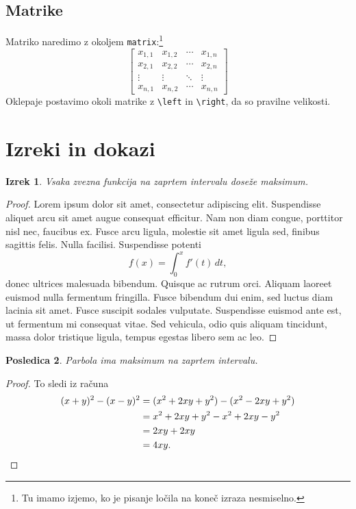 \documentclass{amsart}
\newtheorem{izrek}{Izrek}
\newtheorem{posledica}[izrek]{Posledica}
\begin{document}
\subsection{Matrike}

Matriko naredimo z okoljem \texttt{matrix}:\footnote{Tu imamo izjemo, ko je pisanje ločila
  na koneč izraza nesmiselno.}
%
\begin{equation*}
  \left[
  \begin{matrix}
    x_{1,1} & x_{1,2} & \cdots & x_{1,n} \\
    x_{2,1} & x_{2,2} & \cdots & x_{2,n} \\
    \vdots  & \vdots  & \ddots & \vdots  \\
    x_{n,1} & x_{n,2} & \cdots & x_{n,n}
  \end{matrix}
  \right]
\end{equation*}
%
Oklepaje postavimo okoli matrike z \verb|\left| in \verb|\right|, da so pravilne
velikosti.

\section{Izreki in dokazi}
\label{sec:izreki-dokazi}

\begin{izrek}
  \label{izrek:max-zvezna}
  Vsaka zvezna funkcija na zaprtem intervalu doseže maksimum.
\end{izrek}

\begin{proof}
  Lorem ipsum dolor sit amet, consectetur adipiscing elit. Suspendisse aliquet arcu sit
  amet augue consequat efficitur. Nam non diam congue, porttitor nisl nec, faucibus ex.
  Fusce arcu ligula, molestie sit amet ligula sed, finibus sagittis felis. Nulla facilisi.
  Suspendisse potenti
  \[
    f(x) = \int_0^x f'(t) \, d t,
  \]
  donec ultrices malesuada bibendum. Quisque ac rutrum orci. Aliquam
  laoreet euismod nulla fermentum fringilla. Fusce bibendum dui enim, sed luctus diam
  lacinia sit amet. Fusce suscipit sodales vulputate. Suspendisse euismod ante est, ut
  fermentum mi consequat vitae. Sed vehicula, odio quis aliquam tincidunt, massa dolor
  tristique ligula, tempus egestas libero sem ac leo.
\end{proof}

\begin{posledica}
  Parbola ima maksimum na zaprtem intervalu.
\end{posledica}

\begin{proof}
  To sledi iz računa
  \begin{align*}
    (x + y)^2 - (x - y)^2
    &= (x^2 + 2 x y + y^2) - (x^2 - 2 x y + y^2) \\
    &= x^2 + 2 x y + y^2 - x^2 + 2 x y - y^2 \\
    &= 2 x y + 2 x y \\
    &= 4 x y. \qedhere
  \end{align*}
\end{proof}
\end{document}
